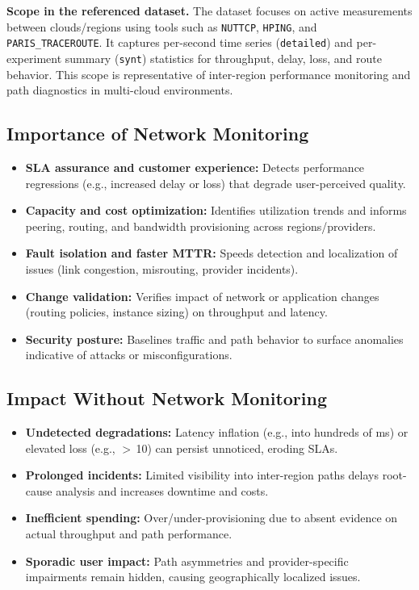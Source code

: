 \documentclass[11pt,a4paper]{article}
\begin{document}
\textbf{Scope in the referenced dataset.} The dataset focuses on active measurements between clouds/regions using tools such as \texttt{NUTTCP}, \texttt{HPING}, and \texttt{PARIS\_TRACEROUTE}. It captures per-second time series (\texttt{detailed}) and per-experiment summary (\texttt{synt}) statistics for throughput, delay, loss, and route behavior. This scope is representative of inter-region performance monitoring and path diagnostics in multi-cloud environments.

\subsection*{Importance of Network Monitoring}
\begin{itemize}[leftmargin=1.2em]
  \item \textbf{SLA assurance and customer experience:} Detects performance regressions (e.g., increased delay or loss) that degrade user-perceived quality.
  \item \textbf{Capacity and cost optimization:} Identifies utilization trends and informs peering, routing, and bandwidth provisioning across regions/providers.
  \item \textbf{Fault isolation and faster MTTR:} Speeds detection and localization of issues (link congestion, misrouting, provider incidents).
  \item \textbf{Change validation:} Verifies impact of network or application changes (routing policies, instance sizing) on throughput and latency.
  \item \textbf{Security posture:} Baselines traffic and path behavior to surface anomalies indicative of attacks or misconfigurations.
\end{itemize}

\subsection*{Impact Without Network Monitoring}
\begin{itemize}[leftmargin=1.2em]
  \item \textbf{Undetected degradations:} Latency inflation (e.g., into hundreds of ms) or elevated loss (e.g., $>$\,10) can persist unnoticed, eroding SLAs.
  \item \textbf{Prolonged incidents:} Limited visibility into inter-region paths delays root-cause analysis and increases downtime and costs.
  \item \textbf{Inefficient spending:} Over/under-provisioning due to absent evidence on actual throughput and path performance.
  \item \textbf{Sporadic user impact:} Path asymmetries and provider-specific impairments remain hidden, causing geographically localized issues.
\end{itemize}
\end{document}
